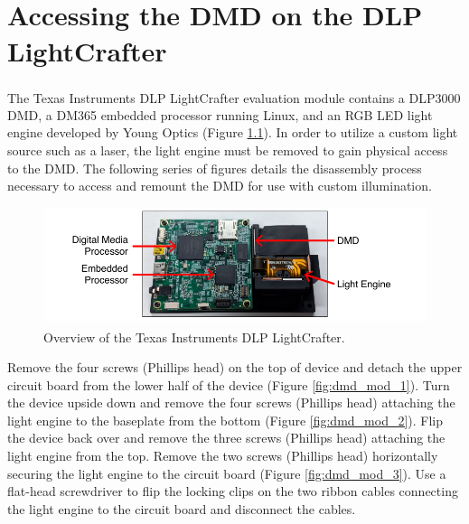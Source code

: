 
\chapter{Accessing the DMD on the DLP\textsuperscript{\textregistered} LightCrafter\texttrademark{}}

The Texas Instruments DLP\textsuperscript{\textregistered} LightCrafter\texttrademark{} evaluation module contains a DLP3000 DMD, a DM365 embedded processor running Linux, and an RGB LED light engine developed by Young Optics (Figure \ref{fig:dmd_mod_0}). In order to utilize a custom light source such as a laser, the light engine must be removed to gain physical access to the DMD. The following series of figures details the disassembly process necessary to access and remount the DMD for use with custom illumination.

\begin{figure}
    \includegraphics{figures/appendix_b/dmd_mod_0.pdf}
    \caption {
        \label{fig:dmd_mod_0}
        Overview of the Texas Instruments DLP\textsuperscript{\textregistered} LightCrafter\texttrademark{}.
    }
\end{figure}

Remove the four screws (Phillips head) on the top of device and detach the upper circuit board from the lower half of the device (Figure \ref{fig:dmd_mod_1}). Turn the device upside down and remove the four screws (Phillips head) attaching the light engine to the baseplate from the bottom (Figure \ref{fig:dmd_mod_2}). Flip the device back over and remove the three screws (Phillips head) attaching the light engine from the top. Remove the two screws (Phillips head) horizontally securing the light engine to the circuit board (Figure \ref{fig:dmd_mod_3}). Use a flat-head screwdriver to flip the locking clips on the two ribbon cables connecting the light engine to the circuit board and disconnect the cables.


